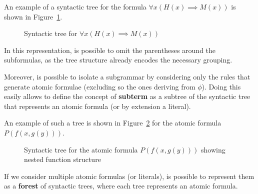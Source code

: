 An example of a syntactic tree for the formula \(\forall x (H(x) \implies M(x))\) is shown in Figure~\ref{fig:syntactic_tree}.

\begin{figure}[H]
    \centering
    \caption{Syntactic tree for \(\forall x (H(x) \implies M(x))\)}\label{fig:syntactic_tree}
\end{figure}

In this representation, is possible to omit the parentheses around the subformulas, as the tree structure already encodes the necessary grouping.

Moreover, is possible to isolate a subgrammar by considering only the rules that generate atomic formulae (excluding so the ones deriving from \(\phi\)). Doing this easily allows to define the concept of \textbf{subterm} as a subtree of the syntactic tree that represents an atomic formula (or by extension a literal).

An example of such a tree is shown in Figure~\ref{fig:subterm_tree} for the atomic formula \(P(f(x, g(y)))\).
\begin{figure}[H]
    \centering
    \caption{Syntactic tree for the atomic formula \(P(f(x, g(y)))\) showing nested function structure}\label{fig:subterm_tree}
\end{figure}

If we consider multiple atomic formulas (or literals), is possible to represent them as a \textbf{forest} of syntactic trees, where each tree represents an atomic formula.

